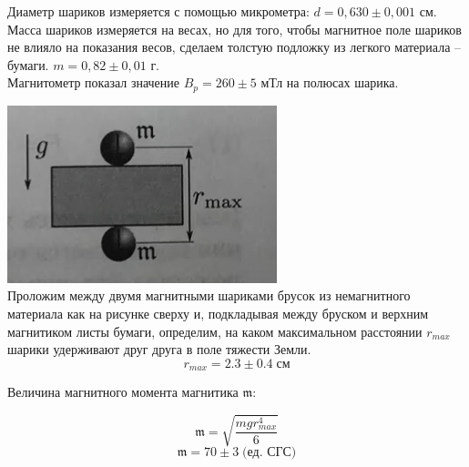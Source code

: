 \documentclass[a4paper,12pt]{article}
\begin{document}
Диаметр шариков измеряется с помощью микрометра: $d = 0,630 \pm 0,001 $ см. \\
Масса шариков измеряется на весах, но для того, чтобы магнитное поле шариков не влияло на показания весов, сделаем толстую подложку из легкого материала -- бумаги. $m = 0,82 \pm 0,01 $ г. \\
Магнитометр показал значение $B_{p} = 260 \pm 5 $ мТл на полюсах шарика.
\begin{center}
\begin{minipage}{0.4\textwidth}
 \includegraphics[width=\linewidth]{1.jpg}\\
Проложим между двумя магнитными шариками брусок из немагнитного материала как на рисунке сверху и, подкладывая между бруском и верхним магнитиком листы бумаги, определим, на каком максимальном расстоянии $r_{max}$ шарики удерживают друг друга в поле тяжести Земли. \[r_{max} = 2.3 \pm 0.4 \; \text{см}\]

Величина магнитного момента магнитика $\mathfrak{m}$:

\[ \mathfrak{m} = \sqrt{\frac{mgr^4_{max}}{6}} \]
\[ \mathfrak{m} = 70 \pm 3 \; \text{(ед. СГС)} \]


\end{minipage}
\end{center}
\end{document}
